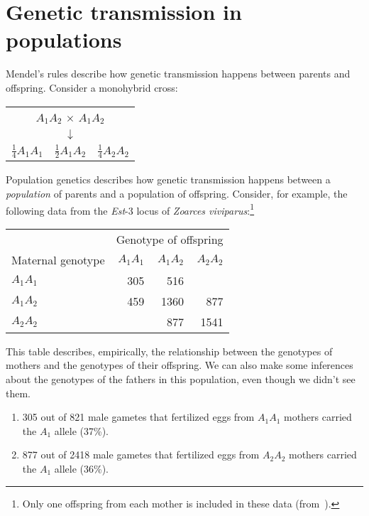 \chapter{Genetic transmission in populations}

Mendel's rules describe how genetic transmission happens between
parents and offspring. Consider a monohybrid cross:

\begin{center}
\begin{tabular}{ccc}
\multicolumn{3}{c}{$A_1A_2$ $\times$ $A_1A_2$} \\
 & $\downarrow$ & \\
$\frac{1}{4}A_1A_1$ & $\frac{1}{2}A_1A_2$ & $\frac{1}{4}A_2A_2$ \\
\end{tabular}
\end{center}

\noindent Population genetics describes how genetic transmission
happens between a {\it population\/} of parents and a population of
offspring.  Consider, for example, the following data from the {\it
  Est\/}-3 locus of {\it Zoarces
  viviparus}:\footnote{Only one offspring from each mother is included
  in these data (from~\cite{Christiansen-1980}).}

\begin{center}
\begin{tabular}{lrrr}
                  & \multicolumn{3}{c}{Genotype of offspring} \\
Maternal genotype & $A_1A_1$ & $A_1A_2$ & $A_2A_2$ \\
\hline
$A_1A_1$          &      305 &      516 & \\
$A_1A_2$          &      459 &     1360 & 877 \\
$A_2A_2$          &          &      877 & 1541 \\
\end{tabular}
\end{center}

\noindent This table describes, empirically, the relationship between
the genotypes of mothers and the genotypes of their offspring. We can
also make some inferences about the genotypes of the fathers in this
population, even though we didn't see them.

\begin{enumerate}

\item 305 out of 821 male gametes that fertilized eggs from $A_1A_1$
mothers carried the $A_1$ allele (37\%).

\item 877 out of 2418 male gametes that fertilized eggs from $A_2A_2$
mothers carried the $A_1$ allele (36\%).

\end{enumerate}

